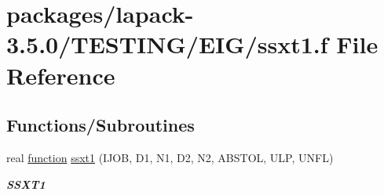 \hypertarget{ssxt1_8f}{}\section{packages/lapack-\/3.5.0/\+T\+E\+S\+T\+I\+N\+G/\+E\+I\+G/ssxt1.f File Reference}
\label{ssxt1_8f}
\subsection*{Functions/\+Subroutines}
\begin{DoxyCompactItemize}
\item 
real \hyperlink{afunc_8m_a7b5e596df91eadea6c537c0825e894a7}{function} \hyperlink{group__single__eig_ga8f56dead1fe2a44da7b5e261280a441e}{ssxt1} (I\+J\+O\+B, D1, N1, D2, N2, A\+B\+S\+T\+O\+L, U\+L\+P, U\+N\+F\+L)
\begin{DoxyCompactList}\small\item\em {\bfseries S\+S\+X\+T1} \end{DoxyCompactList}\end{DoxyCompactItemize}
